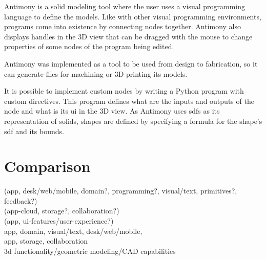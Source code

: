 Antimony is a solid modeling tool where the user uses a visual programming language to define the models.
Like with other visual programming environments, programs come into existence by connecting nodes together.
Antimony also displays handles in the 3D view that can be dragged with the mouse to change properties of some nodes of the program being edited.

Antimony was implemented as a tool to be used from design to fabrication, so it can generate files for machining or 3D printing its models.

It is possible to implement custom nodes by writing a Python program with custom directives.
This program defines what are the inputs and outputs of the node and what is its \gls{ui} in the 3D view.
As Antimony uses \glspl{sdf} as its representation of solids, shapes are defined by specifying a formula for the shape's \gls{sdf} and its bounds.

\section{Comparison}

(app, desk/web/mobile, domain?, programming?, visual/text, primitives?, feedback?)\\
(app-cloud, storage?, collaboration?)\\
(app, ui-features/user-experience?)\\
app, domain, visual/text, desk/web/mobile,\\
app, storage, collaboration\\
3d functionality/geometric modeling/CAD capabilities\\

